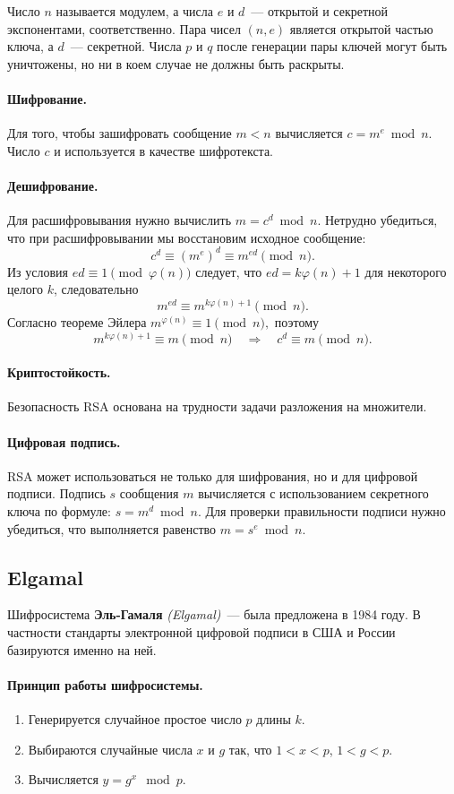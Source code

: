 \documentclass[a4paper,10pt]{article}
\begin{document}
Число $n$ называется модулем, а числа $e$ и $d$~--- открытой и секретной экспонентами, соответственно.
Пара чисел $(n,e)$ является открытой частью ключа, а $d$~--- секретной. Числа $p$ и $q$ после
генерации пары ключей могут быть уничтожены, но ни в коем случае не должны быть раскрыты.
 
\paragraph{Шифрование.}
Для того, чтобы зашифровать сообщение $m<n$ вычисляется $c=m^e\bmod n. $
Число $c$ и используется в качестве шифротекста. 

\paragraph{Дешифрование.}
Для расшифровывания нужно вычислить $m=c^d\bmod n.$
Нетрудно убедиться, что при расшифровывании мы восстановим исходное сообщение:
    $$c^d\equiv (m^e)^d\equiv m^{ed}\pmod n.$$
Из условия $ed\equiv 1\pmod{\varphi(n)}$
следует, что $ed=k\varphi(n)+1$ для некоторого целого $k$, следовательно
    $$m^{ed}\equiv m^{k\varphi(n)+1}\pmod n.$$
Согласно теореме Эйлера
    $m^{\varphi(n)}\equiv 1\pmod n, $
поэтому
$$m^{k\varphi(n)+1}\equiv m \pmod n \quad \Rightarrow \quad c^d\equiv m\pmod n.$$

\paragraph{Криптостойкость.} 
Безопасность RSA основана на трудности задачи разложения на множители.

\paragraph{Цифровая подпись.}
RSA может использоваться не только для шифрования, но и для цифровой подписи. 
Подпись $s$ сообщения $m$ вычисляется с использованием секретного ключа по формуле:
    $s=m^d\bmod n.$
Для проверки правильности подписи нужно убедиться, что выполняется равенство
    $m=s^e\bmod n.$

\subsection{Elgamal}
Шифросистема {\bf Эль-Гамаля} {\it (Elgamal)}~--- была предложена в 1984 году. 
В частности стандарты электронной цифровой подписи в США и России базируются именно на ней.
\paragraph{Принцип работы шифросистемы.} 
\begin{enumerate}
   \item Генерируется случайное простое число $p$ длины $k$.
   \item Выбираются случайные числа $x$ и $g$ так, что $1 < x < p$, $1 < g < p$.
   \item Вычисляется $y = g^x \mod p$.
\end{enumerate}
\end{document}

